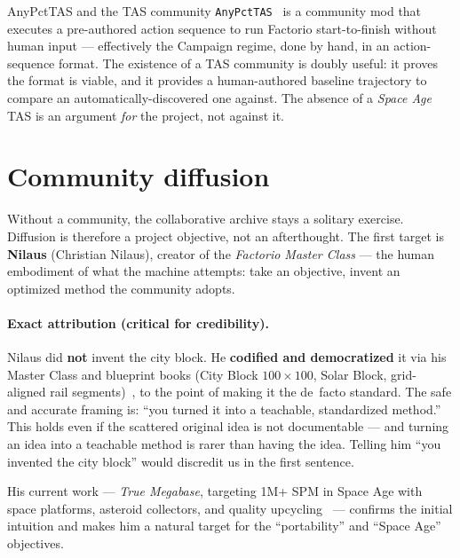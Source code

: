 \documentclass[11pt,a4paper]{article}
\begin{document}
\begin{toolbox}{AnyPctTAS and the TAS community}
\texttt{AnyPctTAS}~\cite{anypcttas} is a community mod that executes a
pre-authored action sequence to run Factorio start-to-finish without human input
--- effectively the Campaign regime, done by hand, in an action-sequence format.
The existence of a TAS community is doubly useful: it proves the format is
viable, and it provides a human-authored baseline trajectory to compare an
automatically-discovered one against. The absence of a \emph{Space Age} TAS is an
argument \emph{for} the project, not against it.
\end{toolbox}

\section{Community diffusion}
\label{sec:diffusion}

Without a community, the collaborative archive stays a solitary exercise.
Diffusion is therefore a project objective, not an afterthought. The first target
is \textbf{Nilaus} (Christian Nilaus), creator of the \emph{Factorio Master
Class} --- the human embodiment of what the machine attempts: take an objective,
invent an optimized method the community adopts.

\paragraph{Exact attribution (critical for credibility).}
Nilaus did \textbf{not} invent the city block. He \textbf{codified and
democratized} it via his Master Class and blueprint books (City Block
$100\times100$, Solar Block, grid-aligned rail
segments)~\cite{nilaus_cityblock,nilaus_masterclass}, to the point of making it
the de~facto standard. The safe and accurate framing is: ``you turned it into a
teachable, standardized method.'' This holds even if the scattered original idea
is not documentable --- and turning an idea into a teachable method is rarer than
having the idea. Telling him ``you invented the city block'' would discredit us in
the first sentence.

His current work --- \emph{True Megabase}, targeting 1M+ SPM in Space Age with
space platforms, asteroid collectors, and quality upcycling~\cite{nilaus_megabase}
--- confirms the initial intuition and makes him a natural target for the
``portability'' and ``Space Age'' objectives.
\end{document}
